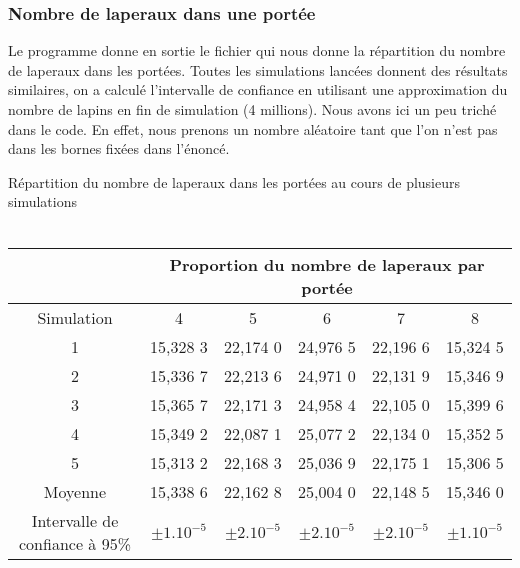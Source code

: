 \documentclass[11)pt,a4paper]{article}
\begin{document}
        \subsubsection{Nombre de laperaux dans une portée}
            Le programme donne en sortie le fichier  qui nous donne la répartition du nombre de laperaux dans les portées.
            Toutes les simulations lancées donnent des résultats similaires, on a calculé l'intervalle de confiance en utilisant 
            une approximation du nombre de lapins en fin de simulation (4 millions).
            Nous avons ici un peu triché dans le code. En effet, nous prenons un nombre aléatoire tant que l'on n'est pas dans les bornes fixées dans l'énoncé.
            \begin{center} 
                Répartition du nombre de laperaux dans les portées au cours de plusieurs simulations
                \\\hfill\\
                \begin{tabular}{|c|c|c|c|c|c|}
                    \hline
                     & \multicolumn{5}{c|}{Proportion du nombre de laperaux par portée} \\
                    \hline
                    Simulation & 4 & 5 & 6 & 7 & 8\\
                    \hline
                    1 & 15,328 3 & 22,174 0 & 24,976 5 & 22,196 6 & 15,324 5\\
                    \hline
                    2 & 15,336 7 & 22,213 6 & 24,971 0 & 22,131 9 & 15,346 9\\
                    \hline
                    3 & 15,365 7 & 22,171 3 & 24,958 4 & 22,105 0 & 15,399 6\\
                    \hline
                    4 & 15,349 2 & 22,087 1 & 25,077 2 & 22,134 0 & 15,352 5\\
                    \hline
                    5 & 15,313 2 & 22,168 3 & 25,036 9 & 22,175 1 & 15,306 5\\
                    \hline
                    Moyenne & 15,338 6 & 22,162 8 & 25,004 0 & 22,148 5 & 15,346 0\\
                    \hline
                    Intervalle de confiance à 95\% & $\pm 1.10^{-5} $ & $\pm 2.10^{-5} $ & $\pm 2.10^{-5} $ & $\pm 2.10^{-5} $ & $\pm 1.10^{-5} $\\
                    \hline
                \end{tabular} 
            \end{center}
\end{document}
